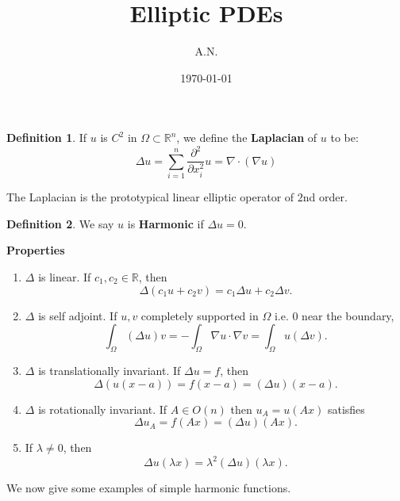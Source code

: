 \documentclass[12pt, a4paper]{article}
\title{Elliptic PDEs}
\author{A.N.}
\date{\today}
\theoremstyle{definition}
\newtheorem{defn}{Definition}
\newcommand{\R}{\mathbb{R}}                           %
\newcommand{\grad}{\nabla}
\begin{document}
\maketitle
\begin{tcolorbox}[colback = white]
\begin{defn}
	If $u$ is $C^2$ in $\Omega\subset \R^n$, we define the \textbf{Laplacian} of $u$ to be:
	$$ \Delta u = \sum_{i=1}^n \frac{ \partial^2 }{ \partial x_i^2 } u = \grad \cdot (\grad u) $$ 
\end{defn}
\end{tcolorbox}
The Laplacian is the prototypical linear elliptic operator of $2$nd order. 
\begin{tcolorbox}[colback = white]
\begin{defn}
	We say $u$ is \textbf{Harmonic} if $\Delta u = 0$. 
\end{defn}
\end{tcolorbox}
\begin{tcolorbox}[colback = white]
	\textbf{Properties}
	\begin{enumerate}[label = \roman*)]
		\item $\Delta$ is linear. If $c_1,c_2 \in \R$, then 
			$$ \Delta \left( c_1 u + c_2 v \right) = c_1 \Delta u + c_2 \Delta v. $$ 
		\item $\Delta$ is self adjoint. If $u,v$ completely supported in $\Omega$ i.e. $0$ near the boundary, 
			$$ \int_\Omega \left( \Delta u \right) v = - \int_\Omega \grad u \cdot \grad v = \int_\Omega u \left( \Delta v \right). $$ 
	\item $\Delta$ is translationally invariant. If $\Delta u  =f$, then
	$$ \Delta \left( u(x-a) \right) = f(x-a) = \left( \Delta u \right) (x-a).$$
\item $\Delta$ is rotationally invariant. If $A \in O(n)$ then $u_A = u(Ax)$ satisfies
	$$ \Delta u_A = f(Ax) = \left( \Delta u \right) (Ax). $$ 
	\item If $\lambda \neq 0$, then 
		$$ \Delta u(\lambda x) = \lambda^2 \left( \Delta u \right) \left( \lambda x \right). $$ 
\end{enumerate}
\end{tcolorbox}
We now give some examples of simple harmonic functions. 
\end{document}
